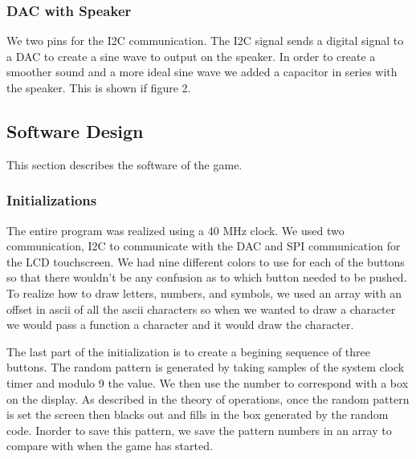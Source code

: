 \documentclass[draft]{article}
\begin{document}
\subsubsection{DAC with Speaker}
We two pins for the I2C communication.  The I2C signal sends a digital signal to a DAC to create a sine wave to output on the speaker.  In order to create a smoother sound and a more ideal sine wave we added a capacitor in series with the speaker.  This is shown if figure 2.

\subsection{Software Design}
This section describes the software of the game.  
\subsubsection{Initializations}
The entire program was realized using a 40 MHz clock.  We used two communication, I2C to communicate with the DAC and SPI communication for the LCD touchscreen.  We had nine different colors to use for each of the buttons so that there wouldn't be any confusion as to which button needed to be pushed.  To realize how to draw letters, numbers, and symbols, we used an array with an offset in ascii of all the ascii characters so when we wanted to draw a character we would pass a function a character and it would draw the character.  
\par\noindent
The last part of the initialization is to create a begining sequence of three buttons.  The random pattern is generated by taking samples of the system clock timer and modulo 9 the value.  We then use the number to correspond with a box on the display.  As described in the theory of operations, once the random pattern is set the screen then blacks out and fills in the box generated by the random code.  Inorder to save this pattern, we save the pattern numbers in an array to compare with when the game has started.  
\end{document}
